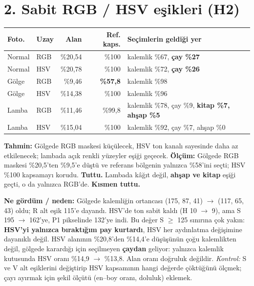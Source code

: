 \documentclass[9pt,a4paper]{extarticle}
\newcommand{\anah}[1]{\textbf{#1}}                        %
\newcommand{\iyi}[1]{\textcolor{yesil}{\textbf{#1}}}      %
\newcommand{\kucuk}{\fontsize{8}{9.5}\selectfont}
\newenvironment{sutun}[1]{\begin{minipage}[t]{#1}\setlength{\parskip}{0.5ex}}{\end{minipage}}
\begin{document}
\begin{sutun}{0.515\linewidth}
\section*{2. Sabit RGB / HSV eşikleri (H2)}
{\kucuk
\begin{tabularx}{\linewidth}{@{}llRRY@{}}
\toprule
\textbf{Foto.} & \textbf{Uzay} & \textbf{Alan} & \textbf{Ref. kaps.} & \textbf{Seçimlerin geldiği yer} \\
\midrule
Normal & RGB & \%20,54 & \%100 & kalemlik \%67, \textbf{çay \%27} \\
Normal & HSV & \%20,78 & \%100 & kalemlik \%72, \textbf{çay \%26} \\
Gölge  & RGB & \%9,46  & \textbf{\%57,8} & kalemlik \%98 \\
Gölge  & HSV & \%14,38 & \%100 & kalemlik \%96 \\
Lamba  & RGB & \%11,46 & \%99,8 & kalemlik \%78, çay \%9, \textbf{kitap \%7, ahşap \%5} \\
Lamba  & HSV & \%15,04 & \%100 & kalemlik \%92, çay \%7, ahşap \%0 \\
\bottomrule
\end{tabularx}\par}

\anah{Tahmin:} Gölgede RGB maskesi küçülecek, HSV ton kanalı sayesinde daha az etkilenecek; lambada açık renkli yüzeyler eşiği geçecek.
\anah{Ölçüm:} Gölgede RGB maskesi \%20,5'ten \%9,5'e düştü ve referans bölgenin yalnızca \%58'ini seçti; HSV \%100 kapsamayı korudu. \iyi{Tuttu.}
Lambada kâğıt değil, \textbf{ahşap ve kitap} eşiği geçti, o da yalnızca RGB'de. \anah{Kısmen tuttu.}

\anah{Ne gördüm / neden:} Gölgede kalemliğin ortancası (175, 87, 41) $\rightarrow$ (117, 65, 43) oldu; R alt eşik 115'e dayandı. HSV'de ton sabit kaldı (H 10 $\rightarrow$ 9), ama S 195 $\rightarrow$ 162'ye, P1 pikselinde 132'ye indi. Bu değer S $\geq$ 125 sınırına çok yakın: \textbf{HSV'yi yalnızca bıraktığım pay kurtardı}, HSV her aydınlatma değişimine dayanıklı değil.
HSV alanının \%20,8'den \%14,4'e düşüşünün çoğu kalemlikten değil, gölgede karardığı için seçilmeyen \textbf{çaydan} geliyor: yalnızca kalemlik kutusunda HSV oranı \%14,9 $\rightarrow$ \%13,8. Alan oranı doğruluk değildir.
\textit{Kontrol:} S ve V alt eşiklerini değiştirip HSV kapsamının hangi değerde çöktüğünü ölçmek; çayı ayırmak için şekil ölçütü (en--boy oranı, doluluk) eklemek.
\end{sutun}
\end{document}
